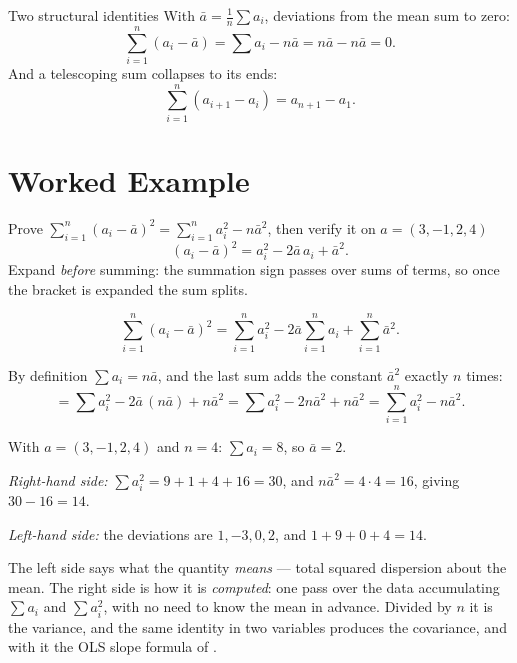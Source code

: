 \begin{rulebox}{Two structural identities}
With $\bar a=\frac1n\sum a_{i}$, deviations from the mean sum to zero:
\[
  \sum_{i=1}^{n}(a_{i}-\bar a)=\sum a_{i}-n\bar a=n\bar a-n\bar a=0 .
\]
And a telescoping sum collapses to its ends:
\[
  \sum_{i=1}^{n}(a_{i+1}-a_{i})=a_{n+1}-a_{1} .
\]
\end{rulebox}

\section{Worked Example}

\begin{worked}{Prove $\sum_{i=1}^{n}(a_{i}-\bar a)^{2}=\sum_{i=1}^{n}a_{i}^{2}-n\bar a^{2}$, then verify it on $a=(3,-1,2,4)$}
\[
  (a_{i}-\bar a)^{2}=a_{i}^{2}-2\bar a\,a_{i}+\bar a^{2} .
\]
Expand \emph{before} summing: the summation sign passes over sums of terms,
so once the bracket is expanded the sum splits.

\[
  \sum_{i=1}^{n}(a_{i}-\bar a)^{2}
  =\sum_{i=1}^{n}a_{i}^{2}-2\bar a\sum_{i=1}^{n}a_{i}+\sum_{i=1}^{n}\bar a^{2} .
\]

By definition $\sum a_{i}=n\bar a$, and the last sum adds the constant
$\bar a^{2}$ exactly $n$ times:
\[
  =\sum a_{i}^{2}-2\bar a\,(n\bar a)+n\bar a^{2}
  =\sum a_{i}^{2}-2n\bar a^{2}+n\bar a^{2}
  =\boxed{\sum_{i=1}^{n}a_{i}^{2}-n\bar a^{2}} .
\]

With $a=(3,-1,2,4)$ and $n=4$: $\sum a_{i}=8$, so $\bar a=2$.

\emph{Right-hand side:}
$\sum a_{i}^{2}=9+1+4+16=30$, and $n\bar a^{2}=4\cdot4=16$, giving
$30-16=14$.

\emph{Left-hand side:} the deviations are $1,-3,0,2$, and
$1+9+0+4=14$. \checkmark

The left side says what the quantity \emph{means} --- total squared
dispersion about the mean. The right side is how it is \emph{computed}: one
pass over the data accumulating $\sum a_{i}$ and $\sum a_{i}^{2}$, with no
need to know the mean in advance. Divided by $n$ it is the variance, and the
same identity in two variables produces the covariance, and with it the
OLS slope formula of .
\end{worked}

